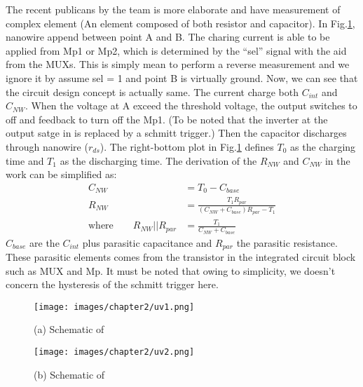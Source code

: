The recent publicans \cite{Juv2} by the team is more elaborate and have measurement of complex element (An element composed of both resistor and capacitor).
In Fig.\ref{fig:tot2}, nanowire append between point A and B.
The charing current is able to be applied from Mp1 or Mp2, which is determined by the ``sel'' signal with the aid from the MUXs.
This is simply mean to perform a reverse measurement and we ignore it by assume sel = 1 and point B is virtually ground.
Now, we can see that the circuit design concept is actually same.
The current charge both $C_{int}$ and $C_{NW}$.
When the voltage at A exceed the threshold voltage, the output switches to off and feedback to turn off the Mp1.
(To be noted that the inverter at the output satge in \cite{Juv1} is replaced by a schmitt trigger.)
Then the capacitor discharges through nanowire ($r_{ds}$).
The right-bottom plot in Fig.\ref{fig:tot2} defines $T_0$ as the charging time and $T_1$ as the discharging time.
The derivation of the $R_{NW}$ and $C_{NW}$ in the work can be simplified as:
\setlength{\mathindent}{2cm}
\begin{align}
                         C_{NW}            & = T_0 - C_{base}\\
                         R_{NW}            & = \frac{T_1R_{par}}{(C_{NW} + C_{base})R_{par} - T_1}\\
    \text{where} \qquad  R_{NW} || R_{par} & = \frac{T_1}{C_{NW} + C_{base}}
\end{align}
$C_{base}$ are the $C_{int}$ plus parasitic capacitance and $R_{par}$ the parasitic resistance.
These parasitic elements comes from the transistor in the integrated circuit block such as MUX and Mp.
It must be noted that owing to simplicity, we doesn't concern the hysteresis of the schmitt trigger here.

\begin{figure}[!htbp]
    \begin{minipage}[t][0.1\textheight]{0.6\textwidth}
        \centering
        \texttt{[image: images/chapter2/uv1.png]}
        \caption{(a) Schematic of \cite{Juv1}}
        \label{fig:tot1}
    \end{minipage}
    \hfill
    \begin{minipage}[t][0.1\textheight]{0.4\textwidth}
        \centering
        \texttt{[image: images/chapter2/uv2.png]}
        \caption{(b) Schematic of \cite{Juv2}}
        \label{fig:tot2}
    \end{minipage}
    \fontsize{6}{7}\selectfont
\end{figure}

